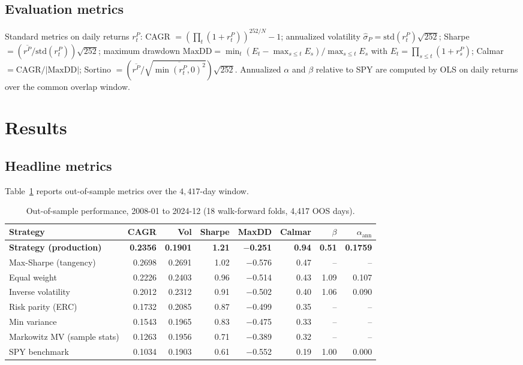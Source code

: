 \documentclass[11pt]{article}
\begin{document}
\subsection{Evaluation metrics}

Standard metrics on daily returns $r_t^P$: CAGR $= (\prod_t(1+r_t^P))^{252/N} - 1$;
annualized volatility $\hat{\sigma}_P = \mathrm{std}(r_t^P)\sqrt{252}$;
Sharpe $= (\overline{r^P}/\mathrm{std}(r_t^P))\sqrt{252}$;
maximum drawdown $\mathrm{MaxDD} = \min_t (E_t - \max_{s\leq t}E_s)/\max_{s\leq t}E_s$
with $E_t = \prod_{s\leq t}(1+r_s^P)$;
Calmar $= \mathrm{CAGR}/|\mathrm{MaxDD}|$;
Sortino $= (\overline{r^P}/\sqrt{\overline{\min(r_t^P,0)^2}})\sqrt{252}$.
Annualized $\alpha$ and $\beta$ relative to SPY are computed by OLS on
daily returns over the common overlap window.

\section{Results}\label{sec:results}

\subsection{Headline metrics}\label{sec:headline}

Table~\ref{tab:headline} reports out-of-sample metrics over the
$4{,}417$-day window.

\begin{table}[h]
\centering
\caption{Out-of-sample performance, 2008-01 to 2024-12 (18 walk-forward folds, 4{,}417 OOS days).}
\label{tab:headline}
\small
\begin{tabular}{lrrrrrrr}
\toprule
Strategy & CAGR & Vol & Sharpe & MaxDD & Calmar & $\beta$ & $\alpha_{\text{ann}}$ \\
\midrule
\textbf{Strategy (production)} & \textbf{0.2356} & \textbf{0.1901} & \textbf{1.21} & \textbf{$-$0.251} & \textbf{0.94} & \textbf{0.51} & \textbf{0.1759} \\
Max-Sharpe (tangency)          & 0.2698 & 0.2691 & 1.02 & $-$0.576 & 0.47 & --   & --     \\
Equal weight                   & 0.2226 & 0.2403 & 0.96 & $-$0.514 & 0.43 & 1.09 & 0.107  \\
Inverse volatility             & 0.2012 & 0.2312 & 0.91 & $-$0.502 & 0.40 & 1.06 & 0.090  \\
Risk parity (ERC)              & 0.1732 & 0.2085 & 0.87 & $-$0.499 & 0.35 & --   & --     \\
Min variance                   & 0.1543 & 0.1965 & 0.83 & $-$0.475 & 0.33 & --   & --     \\
Markowitz MV (sample stats)    & 0.1263 & 0.1956 & 0.71 & $-$0.389 & 0.32 & --   & --     \\
SPY benchmark                  & 0.1034 & 0.1903 & 0.61 & $-$0.552 & 0.19 & 1.00 & 0.000  \\
\bottomrule
\end{tabular}
\end{table}
\end{document}
